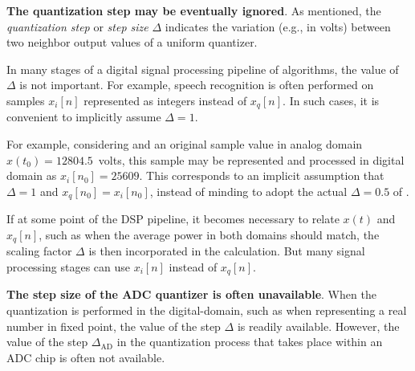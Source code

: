 
\bExample \textbf{The quantization step may be eventually ignored}.
As mentioned, the \emph{quantization step} or \emph{step size} $\Delta$ indicates the variation (e.g., in volts) between two neighbor output values of a uniform quantizer.

In many stages of a digital signal processing pipeline of algorithms, the value of $\Delta$ is not important. For example, speech recognition is often performed on samples $x_i[n]$ represented as integers instead of $x_q[n]$. In such cases, it is
convenient to implicitly assume $\Delta=1$. 

For example, considering  and an original sample value in analog domain $x(t_0)=12804.5$~volts, this sample may be represented and processed in digital domain as $x_i[n_0]= 25609$. This corresponds to an implicit assumption that $\Delta=1$ and $x_q[n_0] = x_i[n_0]$, instead of minding to adopt the actual $\Delta = 0.5$ of .

If at some point of the DSP pipeline, it becomes necessary to relate $x(t)$ and $x_q[n]$, such as when the average power in both domains should match, the scaling factor $\Delta$ is then incorporated in the calculation. But many signal processing stages can use $x_i[n]$ instead of $x_q[n]$.
\eExample 

\bExample \textbf{The step size of the ADC quantizer is often unavailable}.
When the quantization is performed in the digital-domain, such as when representing a real number in fixed point, the value of the step $\Delta$ is readily available. However, the value of the step $\Delta_{\textrm{AD}}$ in the quantization process that takes place within an ADC chip is often not available.

